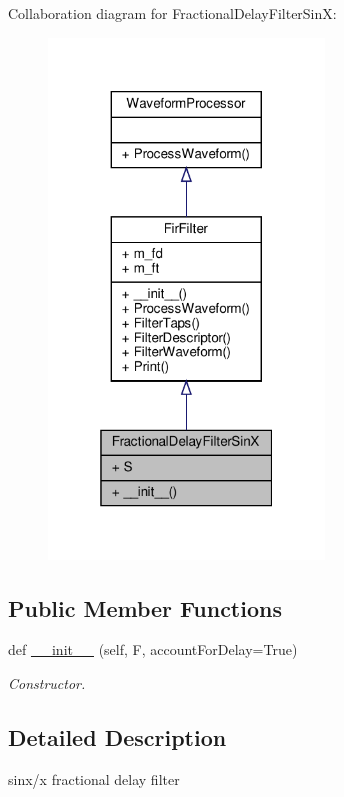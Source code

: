 Collaboration diagram for Fractional\+Delay\+Filter\+SinX\+:
\nopagebreak
\begin{figure}[H]
\begin{center}
\leavevmode
\includegraphics[width=208pt]{classSignalIntegrity_1_1TimeDomain_1_1Filters_1_1InterpolatorSinX_1_1FractionalDelayFilterSinX__coll__graph}
\end{center}
\end{figure}
\subsection*{Public Member Functions}
\begin{DoxyCompactItemize}
\item 
def \hyperlink{classSignalIntegrity_1_1TimeDomain_1_1Filters_1_1InterpolatorSinX_1_1FractionalDelayFilterSinX_a71162faa904c7ea2018b89ebba16c33d}{\+\_\+\+\_\+init\+\_\+\+\_\+} (self, F, account\+For\+Delay=True)
\begin{DoxyCompactList}\small\item\em Constructor. \end{DoxyCompactList}\end{DoxyCompactItemize}


\subsection{Detailed Description}
sinx/x fractional delay filter 

